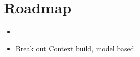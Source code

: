 \documentclass[a4paper, 11pt]{article}
\begin{document}
\section{Roadmap}

\begin{itemize}
    \item
    \item Break out Context build, model based.
\end{itemize}
\end{document}
